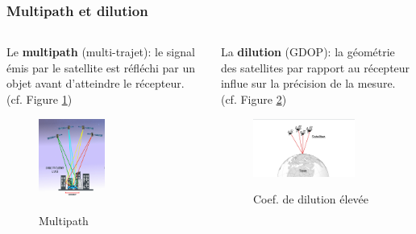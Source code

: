 \documentclass[xcolor=dvipsnames,envcountsect]{beamer}
\begin{document}
\begin{frame}
	\frametitle{Multipath et dilution}
	\justifying
	\begin{columns}
		\begin{column}{0.5\textwidth}
			Le \textbf{multipath} (multi-trajet): le signal émis par le satellite est réfléchi par un objet avant d'atteindre le récepteur. (cf. Figure \ref{fig:multipath})
			\begin{figure}
				\centering
				\includegraphics[width=0.5\textwidth]{./Figures/multipath.png} \\
				\caption {Multipath \cite{esa}}
				\label{fig:multipath}
			\end{figure}
		\end{column}
		\begin{column}{0.5\textwidth}
			La \textbf{dilution} (GDOP): la géométrie des satellites par rapport au récepteur influe sur la précision de la mesure. (cf. Figure \ref{fig:dilution})
			\begin{figure}
				\centering
				\includegraphics[width=0.8\textwidth]{./Figures/dilution.png} \\
				\caption {Coef. de dilution élevée \cite{esa}}
				\label{fig:dilution}
			\end{figure}
			
		\end{column}
	\end{columns}
\end{frame}
\end{document}
